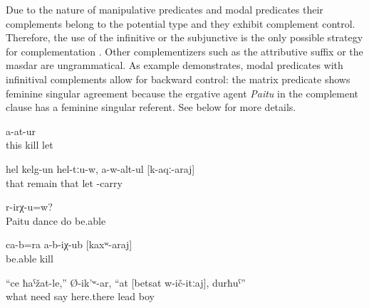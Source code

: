 Due to the nature of manipulative predicates and modal predicates their complements belong to the potential type and they exhibit complement control. Therefore, the use of the infinitive or the subjunctive is the only possible strategy for complementation . Other complementizers such as the attributive suffix or the masdar are ungrammatical. As example  demonstrates, modal predicates with infinitival complements allow for backward control: the matrix predicate shows feminine singular agreement because the ergative agent \textit{Paitu} in the complement clause has a feminine singular referent. See  below for more details.
%
\begin{exe}
	\ex	\label{ex:He did not allow (them) to kill him}
		a-at-ur\\
		this	kill	let\\
	\glt	{}

	\ex	\label{ex:‎‎‎He (the dead body) remained there, not being allowed to bring him (to Sanzhi)}
	\gll	hel	kelg-un	hel-tːu-w,	a-w-alt-ul	[k-aqː-araj]\\
		that	remain	that	let	-carry\\
	\glt	{}

	\ex	\label{ex:‎Is Paitu able to dance}
		r-irχ-u=w?\\
		Paitu	dance	do	be.able\\
	\glt	{}

	\ex	\label{ex:They themselves were not able to kill them}
	\gll	ca-b=ra	a-b-iχ-ub	[kaxʷ-araj]\\
			be.able	kill\\
	\glt	{}

	\ex	\label{ex:‎‎‎What need is there for you, (he) said, to move here and there, boy}
	\gll	``ce	ħaˁžat-le,''	Ø-ik'ʷ-ar,	``at	[betsat	w-ič-itːaj],	durħuˁ''\\
		what	need	say			here.there	lead	boy\\
	\glt	{}
\end{exe}

